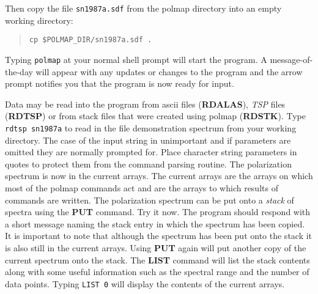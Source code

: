 Then copy the file {\tt sn1987a.sdf} from the {\sc polmap} directory
into an empty working directory: 

\begin{quote}
{\tt cp~\$POLMAP\_DIR/sn1987a.sdf~.} 
\end{quote}

Typing {\tt polmap} at your normal shell prompt will start the
program.  A message-of-the-day will appear with any updates or changes
to the program and the arrow prompt notifies you that the program is
now ready for input.

Data may be read into the program from ascii files ({\bf RDALAS}), {\it
TSP} files ({\bf RDTSP}) or from stack files that were created using
{\sc polmap} ({\bf RDSTK}).   Type {\tt rdtsp sn1987a} to read in the
file demonstration spectrum from your working directory. The case of
the input string in unimportant and if parameters are omitted they are
normally prompted for. Place character string parameters in quotes to
protect them from the command parsing routine.  The polarization
spectrum is now in the current arrays. The current arrays are the
arrays on which most of the {\sc polmap} commands act and are the
arrays to which results of commands are written. The polarization
spectrum can be put onto a {\it stack} of spectra using the {\bf PUT}
command. Try it now. The program should respond with a short message
naming the stack entry in which the spectrum has been copied. It is
important to note that although the spectrum has been put onto the
stack it is also still in the current arrays.  Using {\bf PUT} again
will put another copy of the current spectrum onto the stack. The {\bf
LIST} command will list the stack contents along with some useful
information such as the spectral range and the number of data points.
Typing {\tt LIST 0} will display the contents of the current arrays.

